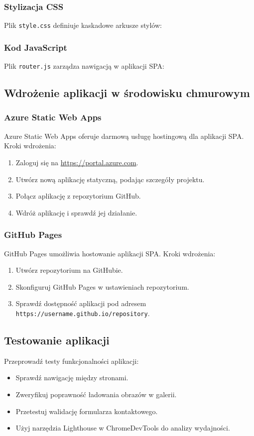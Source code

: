 \documentclass[a4paper,12pt]{article}
\begin{document}
\subsubsection{Stylizacja CSS}
Plik \texttt{style.css} definiuje kaskadowe arkusze stylów:


\subsubsection{Kod JavaScript}
Plik \texttt{router.js} zarządza nawigacją w aplikacji SPA:


\subsection{Wdrożenie aplikacji w środowisku chmurowym}
\subsubsection{Azure Static Web Apps}
Azure Static Web Apps oferuje darmową usługę hostingową dla aplikacji SPA. Kroki wdrożenia:
\begin{enumerate}
    \item Zaloguj się na \url{https://portal.azure.com}.
    \item Utwórz nową aplikację statyczną, podając szczegóły projektu.
    \item Połącz aplikację z repozytorium GitHub.
    \item Wdróż aplikację i sprawdź jej działanie.
\end{enumerate}

\subsubsection{GitHub Pages}
GitHub Pages umożliwia hostowanie aplikacji SPA. Kroki wdrożenia:
\begin{enumerate}
    \item Utwórz repozytorium na GitHubie.
    \item Skonfiguruj GitHub Pages w ustawieniach repozytorium.
    \item Sprawdź dostępność aplikacji pod adresem \texttt{https://username.github.io/repository}.
\end{enumerate}

\subsection{Testowanie aplikacji}
Przeprowadź testy funkcjonalności aplikacji:
\begin{itemize}
    \item Sprawdź nawigację między stronami.
    \item Zweryfikuj poprawność ładowania obrazów w galerii.
    \item Przetestuj walidację formularza kontaktowego.
    \item Użyj narzędzia Lighthouse w ChromeDevTools do analizy wydajności.
\end{itemize}
\end{document}
